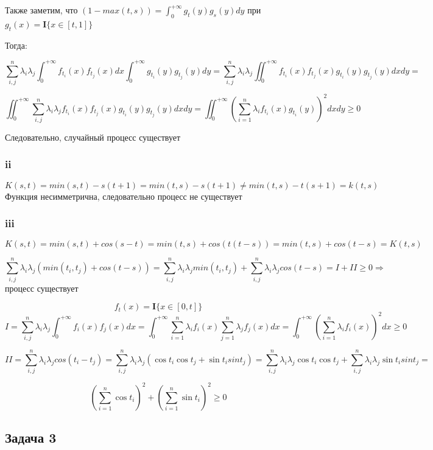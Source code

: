 \documentclass[a4paper,12pt]{article}
\def \mbf{\mathbf}
\def \I{\mbf{I}}
\begin{document}
Также заметим, что $ (1-max(t,s)) = \int_{0}^{+\infty} g_t(y) g_s(y) dy $ при  $ g_t(x) = \I\{ x \in [t, 1] \} $

Тогда:

\[ \sum_{i,j}^{n} \lambda_i \lambda_j \int_{0}^{+\infty} f_{t_i}(x) f_{t_j}(x) dx \int_{0}^{+\infty} g_{t_i}(y) g_{t_j}(y) dy = \sum_{i,j}^{n} \lambda_i \lambda_j \iint_{0}^{+\infty} f_{t_i}(x) f_{t_j}(x)  g_{t_i}(y) g_{t_j}(y) dx dy  =  \]

\[  \iint_{0}^{+\infty} \sum_{i,j}^{n} \lambda_i \lambda_j  f_{t_i}(x) f_{t_j}(x)  g_{t_i}(y) g_{t_j}(y) dx dy =  \iint_{0}^{+\infty} \left(\sum_{i = 1}^{n} \lambda_i  f_{t_i}(x)   g_{t_i}(y) \right)^2 dx dy \ge 0 \]

Следовательно, случайный процесс существует

 \subsubsection{ii}
 \[ K(s,t) = min(s,t) - s(t+1) = min(t,s) - s(t+1) \neq min(t,s) - t(s+1)  = k(t,s) \]
 Функция несимметрична, следовательно процесс не существует
  \subsubsection{iii}
  
  \[ K(s,t) = min(s,t) + cos(s-t) = min(t,s) + cos(t(t-s)) = min(t,s) + cos(t-s) = K(t,s) \]
  
  \[ \sum_{i,j}^{n} \lambda_i\lambda_j (min(t_i, t_j) + cos(t-s)) = \sum_{i,j}^{n} \lambda_i\lambda_j min(t_i, t_j) + \sum_{i,j}^{n} \lambda_i\lambda_j cos(t-s) = I + II  \ge 0 \Rightarrow \] процесс существует
  
\[   f_t(x) = \I\{ x \in [0,t] \} \]
  \[ I =  \sum_{i,j}^{n} \lambda_i\lambda_j \int_{0}^{+\infty} f_i(x)f_j(x)dx =  \int_{0}^{+\infty} \sum_{i= 1}^{n} \lambda_i f_i(x) \sum_{j = 1}^{n} \lambda_j f_j(x) dx = \int_{0}^{+\infty} (\sum_{i = 1}^{n} \lambda_i f_i(x))^2 dx  \ge 0 \]

\[ II = \sum_{i,j}^{n} \lambda_i \lambda_j cos(t_i - t_j)  =  \sum_{i,j}^{n} \lambda_i \lambda_j (\cos t_i \cos t_j + \sin t_i sin t_j) = \sum_{i,j}^{n} \lambda_i \lambda_j \cos t_i \cos t_j + \sum_{i,j}^{n} \lambda_i \lambda_j  \sin t_i sin t_j = \]

\[ (\sum_{i = 1}^{n} \cos t_i)^2 +  (\sum_{i = 1}^{n} \sin t_i)^2 \ge 0 \]


\subsection{Задача 3}
\end{document}
